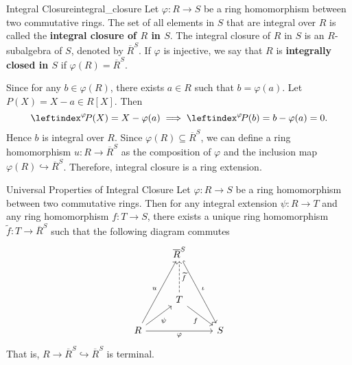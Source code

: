 \begin{definition}{Integral Closure}{integral_closure}
    Let $\varphi:R\to S$ be a ring homomorphism between two commutative rings. The set of all elements in $S$ that are integral over $R$ is called the \textbf{integral closure of $R$ in $S$}. The integral closure of $R$ in $S$ is an $R$-subalgebra of $S$, denoted by $\overline{R}^S$. If $\varphi$ is injective, we say that $R$ is \textbf{integrally closed in $S$} if $\varphi(R)=\overline{R}^S$.
\end{definition}
\begin{remark}
    Since for any $b\in \varphi(R)$, there exists $a\in R$ such that $b=\varphi(a)$. Let $P(X)=X-a\in R[X]$. Then 
    \[
        \leftindex^{\varphi}\!P(X)=X-\varphi(a)\implies \leftindex^{\varphi}\!P(b)=b-\varphi(a)=0.
    \]
    Hence $b$ is integral over $R$. Since $\varphi(R)\subseteq \overline{R}^S$, we can define a ring homomorphism $u:R\to \overline{R}^S$ as the composition of $\varphi$ and the inclusion map $\varphi(R)\hookrightarrow \overline{R}^S$. Therefore, integral closure is a ring extension.
\end{remark}
\begin{proposition}{Universal Properties of Integral Closure}{}
    Let $\varphi:R\to S$ be a ring homomorphism between two commutative rings. Then for any integral extension $\psi:R\to T$ and any ring homomorphism $f:T\to S$, there exists a unique ring homomorphism $\widetilde{f}:T\to \overline{R}^S$ such that the following diagram commutes
    \[
        \begin{tikzcd}
                & \overline{R}^S \arrow[rdd, "\iota", hook]      &   \\[+1.5em]
                & T \arrow[rd, "f"'] \arrow[u, "\widetilde{f}"', dashed] &   \\
    R \arrow[rr, "\varphi"'] \arrow[ru, "\psi"'] \arrow[ruu, "u"] &                                                & S
    \end{tikzcd}
    \]
    That is, $R\to \overline{R}^S \hookrightarrow \overline{R}^S$ is terminal.
\end{proposition}

